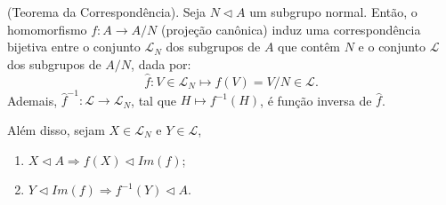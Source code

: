 \documentclass[11pt,openany]{book}
\begin{document}
     \begin{theorem}
     \label{theo:teorema_da_correspondencia}
        (Teorema da Correspondência). Seja $N \triangleleft A$ um subgrupo normal. Então, o homomorfismo
        $f:A\rightarrow A/N$ (projeção canônica) induz uma correspondência bijetiva entre o conjunto $\mathcal{L}_N$ dos subgrupos de $A$ que contêm $N$ e o conjunto $\mathcal{L}$ dos subgrupos de $A/N$, dada por:
        \[\hat{f}:V \in \mathcal{L}_N \longmapsto f(V) = V/N \in \mathcal{L}.\]
        Ademais, $\hat{f}^{-1}:\mathcal{L} \rightarrow \mathcal{L}_N$, tal que $H \mapsto f^{-1}(H)$, é função inversa de $\hat{f}$.

        Além disso, sejam $X \in \mathcal{L}_N$ e $Y \in \mathcal{L}$,
        \begin{enumerate}[label=\roman*.]
            \item $X \triangleleft A \Rightarrow f(X) \triangleleft Im(f)$;
            \item $Y \triangleleft Im(f) \Rightarrow f^{-1}(Y) \triangleleft A$.
        \end{enumerate}
    \end{theorem}
\end{document}
